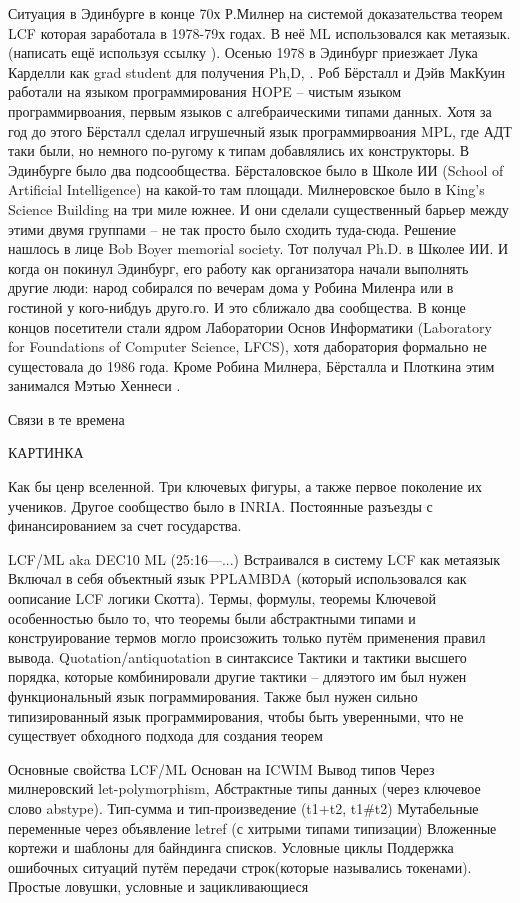 \documentclass[14pt]{matmex-diploma-custom}
\begin{document}
Ситуация в Эдинбурге в конце 70х
Р.Милнер на системой доказательства теорем LCF которая заработала в 1978-79х годах. В неё ML использовался как метаязык. (написать ещё используя ссылку ). Осенью 1978 в Эдинбург приезжает Лука Карделли как grad student для получения Ph,D, . Роб Бёрсталл и Дэйв МакКуин работали на языком программирования HOPE -- чистым языком программирвоания, первым языков с алгебраическими типами данных.  Хотя за год до этого Бёрсталл сделал игрушечный язык программирвоания MPL, где АДТ таки были, но немного по-ругому к типам добавлялись их конструкторы.  
В Эдинбурге было два подсообщества. Бёрсталовское было в Школе ИИ (School of Artificial Intelligence) на какой-то там площади. Милнеровское было в King’s Science Building на три миле южнее. И они сделали существенный барьер между этими двумя группами -- не так просто было сходить туда-сюда. Решение нашлось в лице Bob Boyer memorial society. Тот получал Ph.D. в Школее ИИ. И когда он покинул Эдинбург, его работу как организатора начали выполнять другие люди: народ собирался по вечерам дома у Робина Миленра  или в гостиной у кого-нибдуь друго.го. И это сближало два   сообщества. В конце концов посетители стали ядром Лаборатории Основ Информатики (Laboratory for Foundations of Computer Science, LFCS), хотя даборатория формально не сущестовала до 1986 года.  Кроме Робина Милнера, Бёрсталла и Плоткина этим занимался Мэтью Хеннеси .

Связи в  те времена 

КАРТИНКА

Как бы ценр вселенной. Три ключевых фигуры, а также первое поколение их учеников. Другое сообщество было в INRIA. Постоянные разъезды с финансированием за счет государства.

LCF/ML aka DEC10 ML (25:16---...)
Встраивался в систему LCF как метаязык
Включал в себя объектный язык PPLAMBDA (который использовался как оописание LCF логики Скотта). 
Термы, формулы, теоремы 
Ключевой особенностью было то, что теоремы были абстрактными типами и конструирование термов могло происзожить только путём применения правил вывода.
Quotation/antiquotation в синтаксисе
Тактики и тактики высшего порядка, которые комбинировали другие тактики -- дляэтого им был нужен функциональный язык пограммирования. Также был нужен сильно типизированный язык программирования, чтобы быть уверенными, что не существует обходного подхода для создания теорем

Основные свойства LCF/ML
Основан на ICWIM
Вывод типов Через милнеровский let-polymorphism,
Абстрактные типы данных (через ключевое слово abstype).
Тип-сумма и тип-произведение (t1+t2, t1\#t2)
Мутабельные переменные через объявление letref (с хитрыми типами типизации)
Вложенные кортежи и шаблоны для байндинга списков.
Условные циклы
Поддержка ошибочных ситуаций путём передачи строк(которые назывались токенами). Простые ловушки, условные и зацикливающиеся 
\end{document}

